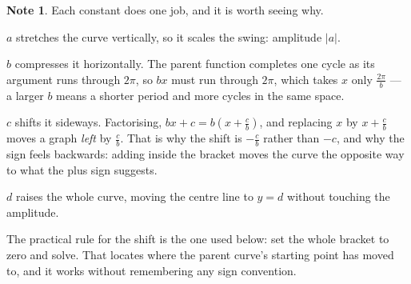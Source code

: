 \documentclass[11pt,a4paper]{article}
\theoremstyle{definition}
\newtheorem{note}[thm]{Note}
\begin{document}
\begin{note}
Each constant does one job, and it is worth seeing why.

$a$ stretches the curve vertically, so it scales the swing: amplitude
$\left|a\right|$.

$b$ compresses it horizontally. The parent function completes one cycle as its
argument runs through $2\pi$, so $bx$ must run through $2\pi$, which takes $x$ only
$\frac{2\pi}{b}$ --- a larger $b$ means a shorter period and more cycles in the same
space.

$c$ shifts it sideways. Factorising, $bx+c=b\left(x+\frac{c}{b}\right)$, and
replacing $x$ by $x+\frac{c}{b}$ moves a graph \emph{left} by $\frac{c}{b}$. That is
why the shift is $-\frac{c}{b}$ rather than $-c$, and why the sign feels backwards:
adding inside the bracket moves the curve the opposite way to what the plus sign
suggests.

$d$ raises the whole curve, moving the centre line to $y=d$ without touching the
amplitude.

The practical rule for the shift is the one used below: set the whole bracket to
zero and solve. That locates where the parent curve's starting point has moved to,
and it works without remembering any sign convention.
\end{note}
\end{document}
